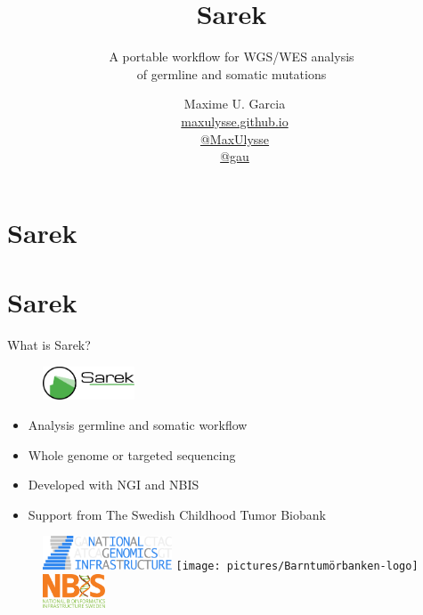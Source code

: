 \documentclass[usepdftitle=false]{beamer}
\title{%
	\vspace{-.8cm}%
	Sarek
}
\subtitle{%
	\normalsize{A portable workflow for WGS/WES analysis\\of germline and somatic mutations}%
	\vspace{-.4cm}%
}
\author{
	\vspace{-.6cm}
	\faUser\ Maxime U. Garcia\\
	\faGlobe\ \href{https://maxulysse.github.io/}{maxulysse.github.io}\\
	\faGithub\ \href{https://github.com/MaxUlysse/}{@MaxUlysse}\\
	\faTwitter\ \href{https://twitter.com/gau/}{@gau}\\
}
\date{\vfill}
\begin{document}
\section{Sarek}

{
	\maketitle
}

\section{Sarek}

\begin{frame}{What is Sarek?}
	\begin{figure}
		\includegraphics[height=1cm]{pictures/Sarek_no_border}
	\end{figure}
	\begin{itemize}
		\item Analysis germline and somatic workflow
		\item Whole genome or targeted sequencing
		\item Developed with NGI and NBIS
		\item Support from The Swedish Childhood Tumor Biobank
	\end{itemize}
	\begin{figure}
		\includegraphics[height=1cm]{pictures/NGI}
		{\hfill}
		\texttt{[image: pictures/Barntumörbanken-logo]}
		{\hfill}
		\includegraphics[height=1cm]{pictures/NBIS}
	\end{figure}
	\vfill
\end{frame}
\end{document}
